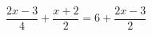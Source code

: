 \begin{ex}
	\begin{condition}
		\( \dfrac{2x-3}{4}+\dfrac{x+2}{2}=6+\dfrac{2x-3}{2} \)
	\end{condition}
\end{ex}